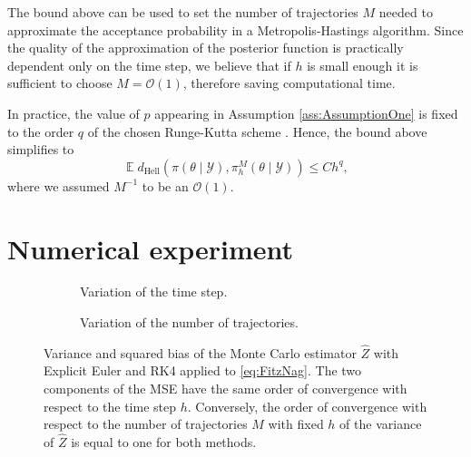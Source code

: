\documentclass{siamart1116}
\numberwithin{theorem}{section}
\newcommand{\OO}{\mathcal{O}}
\newcommand{\E}{\operatorname{\mathbb{E}}}
\newcommand{\Hell}{d_{\mathrm{Hell}}}
\begin{document}
\begin{remark} The bound above can be used to set the number of trajectories $M$ needed to approximate the acceptance probability in a Metropolis-Hastings algorithm. Since the quality of the approximation of the posterior function is practically dependent only on the time step, we believe that if $h$ is small enough it is sufficient to choose $M = \OO(1)$, therefore saving computational time.
\end{remark}

\begin{remark} In practice, the value of $p$ appearing in Assumption \ref{ass:AssumptionOne} is fixed to the order $q$ of the chosen Runge-Kutta scheme \cite{CGS16}. Hence, the bound above simplifies to
	\begin{equation}
		\E\Hell(\pi(\theta\mid\mathcal{Y}),\pi^M_h(\theta\mid\mathcal{Y})) \leq C h^{q},
	\end{equation}
	where we assumed $M^{-1}$ to be an $\OO(1)$.
\end{remark}

\section{Numerical experiment}\label{sect:NumExp}

\begin{figure}
	\centering
	\begin{subfigure}{0.49\linewidth}
		\centering
		\resizebox{1.0\linewidth}{!}{}
		\caption{Variation of the time step.}
		\label{fig:MonteCarloVarianceH}
	\end{subfigure}
	\begin{subfigure}{0.49\linewidth}
		\centering
		\resizebox{1.0\linewidth}{!}{}
		\caption{Variation of the number of trajectories.}
		\label{fig:MonteCarloVarianceM}
	\end{subfigure}
	\caption{Variance and squared bias of the Monte Carlo estimator $\hat Z$ with Explicit Euler and RK4 applied to \eqref{eq:FitzNag}. The two components of the MSE have the same order of convergence with respect to the time step $h$. Conversely, the order of convergence with respect to the number of trajectories $M$ with fixed $h$ of the variance of $\hat Z$ is equal to one for both methods.}
	\label{fig:MonteCarloVariance}
\end{figure}
\end{document}
